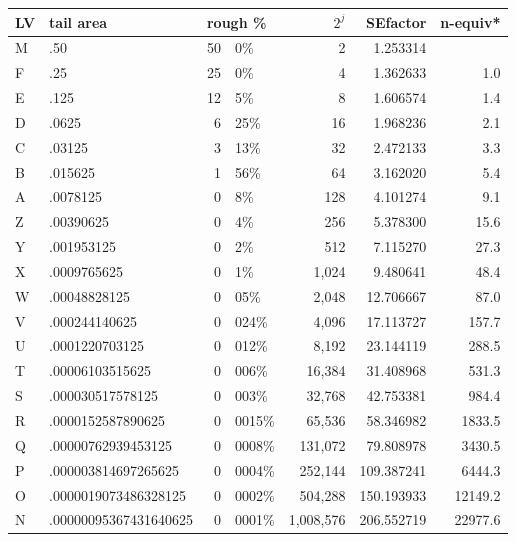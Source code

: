 \documentclass[oneside]{article}
\begin{document}
\begin{table}[htpb]
  \centering
  \begin{tabular}{llr@{.}lrrr}
  \toprule
  LV & tail area & \multicolumn{2}{l}{rough \%} & $2^j$ & SEfactor & n-equiv*\\ \midrule
   M & .50 & 50&0\% & 2 & 1.253314 \\
   F & .25 & 25& 0\% & 4 & 1.362633 & 1.0\\
   E & .125 & 12& 5\% & 8 & 1.606574 & 1.4\\
   D & .0625 & 6& 25\% & 16 & 1.968236 & 2.1\\
   C & .03125 & 3&13\% & 32 & 2.472133 & 3.3\\
   B & .015625 & 1&56\% & 64 & 3.162020 & 5.4\\
   A & .0078125 & 0&8\% & 128 & 4.101274 & 9.1\\
   Z & .00390625 & 0&4\% & 256 & 5.378300 & 15.6\\
   Y & .001953125 & 0&2\% & 512 & 7.115270 & 27.3\\
   X & .0009765625 & 0&1\% & 1,024 & 9.480641 & 48.4\\
   W & .00048828125 & 0&05\% & 2,048 & 12.706667 & 87.0  \\
   V & .000244140625 & 0&024\% & 4,096 & 17.113727 & 157.7\\
   U & .0001220703125 & 0&012\% & 8,192 & 23.144119 & 288.5\\
   T & .00006103515625 & 0&006\% & 16,384 & 31.408968 & 531.3\\
   S & .000030517578125 & 0&003\% & 32,768 & 42.753381 & 984.4\\
   R & .0000152587890625 & 0&0015\% & 65,536 & 58.346982 & 1833.5\\
   Q & .00000762939453125 & 0&0008\% & 131,072 & 79.808978 & 3430.5\\
   P & .000003814697265625 & 0&0004\% & 252,144 & 109.387241 & 6444.3\\
   O & .0000019073486328125 & 0&0002\% & 504,288 & 150.193933 & 12149.2\\
   N & .00000095367431640625 & 0&0001\% &1,008,576 & 206.552719 & 22977.6\\
  \bottomrule
  \end{tabular}


\end{table}
\end{document}
